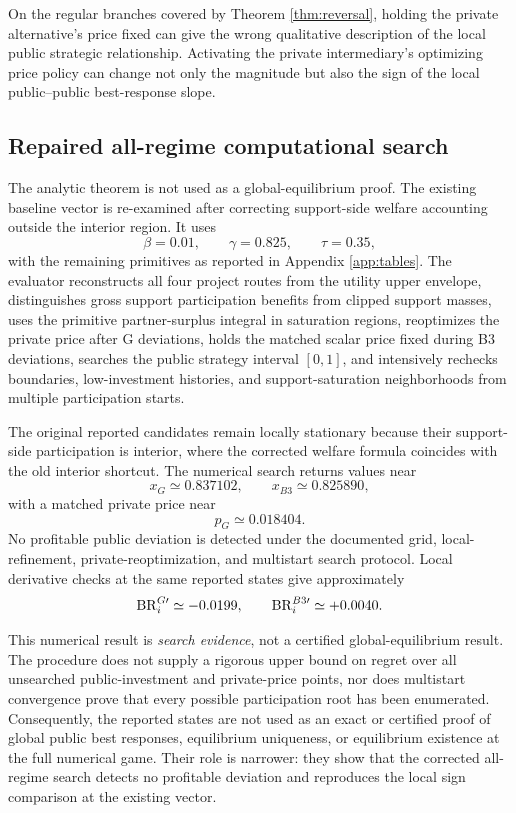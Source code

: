 \begin{corollary}\label{cor:interpretation}
On the regular branches covered by Theorem \ref{thm:reversal}, holding the private alternative's price fixed can give the wrong qualitative description of the local public strategic relationship. Activating the private intermediary's optimizing price policy can change not only the magnitude but also the sign of the local public--public best-response slope.
\end{corollary}

\subsection{Repaired all-regime computational search}\label{sec:searchwitness}

The analytic theorem is not used as a global-equilibrium proof. The existing baseline vector is re-examined after correcting support-side welfare accounting outside the interior region. It uses
\[
\beta=0.01,\qquad \gamma=0.825,\qquad \tau=0.35,
\]
with the remaining primitives as reported in Appendix \ref{app:tables}. The evaluator reconstructs all four project routes from the utility upper envelope, distinguishes gross support participation benefits from clipped support masses, uses the primitive partner-surplus integral in saturation regions, reoptimizes the private price after G deviations, holds the matched scalar price fixed during B3 deviations, searches the public strategy interval $[0,1]$, and intensively rechecks boundaries, low-investment histories, and support-saturation neighborhoods from multiple participation starts.

The original reported candidates remain locally stationary because their support-side participation is interior, where the corrected welfare formula coincides with the old interior shortcut. The numerical search returns values near
\[
x_G\simeq0.837102,\qquad x_{B3}\simeq0.825890,
\]
with a matched private price near
\[
p_G\simeq0.018404.
\]
No profitable public deviation is detected under the documented grid, local-refinement, private-reoptimization, and multistart search protocol. Local derivative checks at the same reported states give approximately
\[
\mathrm{BR}_i^{G\prime}\simeq-0.0199,
\qquad
\mathrm{BR}_i^{B3\prime}\simeq+0.0040.
\]

This numerical result is \emph{search evidence}, not a certified global-equilibrium result. The procedure does not supply a rigorous upper bound on regret over all unsearched public-investment and private-price points, nor does multistart convergence prove that every possible participation root has been enumerated. Consequently, the reported states are not used as an exact or certified proof of global public best responses, equilibrium uniqueness, or equilibrium existence at the full numerical game. Their role is narrower: they show that the corrected all-regime search detects no profitable deviation and reproduces the local sign comparison at the existing vector.

